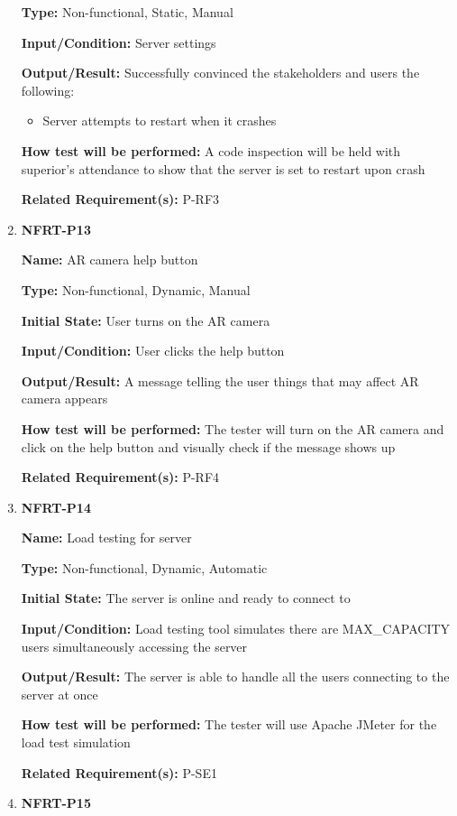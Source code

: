 \documentclass[12pt, titlepage]{article}
\begin{document}
\begin{enumerate}
\textbf{Type:} Non-functional, Static, Manual
					
\textbf{Input/Condition:} Server settings
					
\textbf{Output/Result:} Successfully convinced the stakeholders and users the following:
\begin{itemize}
\item Server attempts to restart when it crashes
\end{itemize}

\textbf{How test will be performed:} A code inspection will be held with superior's attendance to show that the server is set to restart upon crash

\textbf{Related Requirement(s):} P-RF3

\item{\textbf{NFRT-P13}}

\textbf{Name:} AR camera help button

\textbf{Type:} Non-functional, Dynamic, Manual
					
\textbf{Initial State:} User turns on the AR camera

\textbf{Input/Condition:} User clicks the help button
					
\textbf{Output/Result:} A message telling the user things that may affect AR camera appears

\textbf{How test will be performed:} The tester will turn on the AR camera and click on the help button and visually check if the message shows up

\textbf{Related Requirement(s):} P-RF4

\item{\textbf{NFRT-P14}}

\textbf{Name:} Load testing for server

\textbf{Type:} Non-functional, Dynamic, Automatic
					
\textbf{Initial State:} The server is online and ready to connect to

\textbf{Input/Condition:} Load testing tool simulates there are MAX\_CAPACITY users simultaneously accessing the server

\textbf{Output/Result:} The server is able to handle all the users connecting to the server at once

\textbf{How test will be performed:} The tester will use Apache JMeter for the load test simulation

\textbf{Related Requirement(s):} P-SE1

\item{\textbf{NFRT-P15}}


\end{enumerate}
\end{document}
